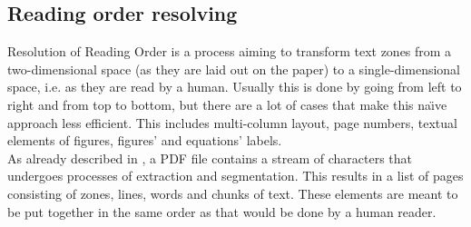 \subsection{Reading order resolving}\label{sec:reading_order}
Resolution of Reading Order is a process aiming to transform text zones from a two-dimensional space (as they are laid out on the paper) to a single-dimensional space, i.e. as they are read by a human. Usually this is done by going from left to right and from top to bottom, but there are a lot of cases that make this na\"\i ve approach less efficient. This includes multi-column layout, page numbers, textual elements of figures, figures' and equations' labels.\\

As already described in \cite{DominikaTkaczykPaweSzostekMateuszFedoryszakPiotrJanDendek2014}, a PDF file contains a stream of characters that undergoes processes of extraction and segmentation. This results in a list of pages consisting of zones, lines, words and chunks of text. These elements are meant to be put together in the same order as that would be done by a human reader.\\

